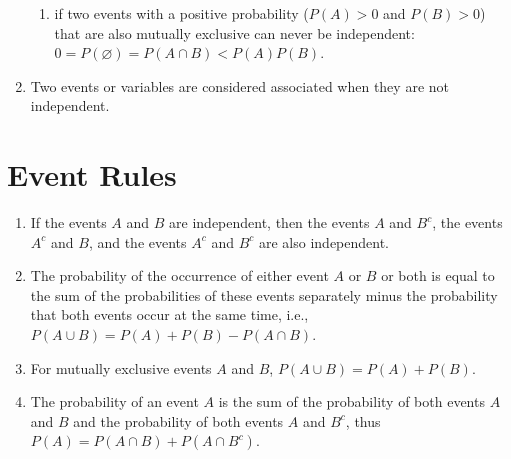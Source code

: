 \begin{enumerate}
\begin{enumerate}
        \item  if two events with a positive probability ($P(A) > 0$ and $P(B) > 0$) that are also mutually exclusive can never be independent: $0 = P(\varnothing) = P(A \cap B) < P(A) P(B)$.
        \hfill \cite{statistics/book/Statistics-for-Data-Scientists/Maurits-Kaptein}
    \end{enumerate}

    \item 
    \begin{definition}
        Two events or variables are considered associated when they are not independent.
    \end{definition}
\end{enumerate}


\section{Event Rules}

\begin{enumerate}
    \item If the events $A$ and $B$ are independent, then the events $A$ and $B^c$, the events $A^c$ and $B$, and the events $A^c$ and $B^c$ are also independent. 
    \hfill \cite{statistics/book/Statistics-for-Data-Scientists/Maurits-Kaptein}

    \item The probability of the occurrence of either event $A$ or $B$ or both is equal to the sum of the probabilities of these events separately minus the probability that both events occur at the same time, i.e., $P (A \cup B) = P (A) + P (B) - P (A \cap B)$.
    \hfill \cite{statistics/book/Statistics-for-Data-Scientists/Maurits-Kaptein}

    \item For mutually exclusive events $A$ and $B$, $P (A \cup B) = P (A) + P (B)$.
    \hfill \cite{statistics/book/Statistics-for-Data-Scientists/Maurits-Kaptein}

    \item 
    \begin{definition}[law of total probability ($P (A) = P (A \cap B) + P (A \cap B^c)$)]
        The probability of an event $A$ is the sum of the probability of both events $A$ and $B$ and the probability of both events $A$ and $B^c$, thus $P (A) = P (A \cap B) + P (A \cap B^c)$. 
        \hfill \cite{statistics/book/Statistics-for-Data-Scientists/Maurits-Kaptein}    
    \end{definition}
\end{enumerate}



